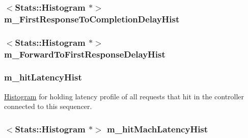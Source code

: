 \label{classProfiler_a32e2ae13dc24a9bd92b83fa9e02477ff}
\hypertarget{classProfiler_a6236c49462f2162310ca62569ec869ac}{
\subsubsection[{m\_\-FirstResponseToCompletionDelayHist}]{$<${\bf Stats::Histogram} $\ast$$>$ {\bf m\_\-FirstResponseToCompletionDelayHist}}}
\label{classProfiler_a6236c49462f2162310ca62569ec869ac}
\hypertarget{classProfiler_ae9bea11c9b001a155e7f7a0f39ac7bf9}{
\subsubsection[{m\_\-ForwardToFirstResponseDelayHist}]{$<${\bf Stats::Histogram} $\ast$$>$ {\bf m\_\-ForwardToFirstResponseDelayHist}}}
\label{classProfiler_ae9bea11c9b001a155e7f7a0f39ac7bf9}
\hypertarget{classProfiler_aa7b4f1cb2f6f69fac85f5fa0be12f95a}{
\subsubsection[{m\_\-hitLatencyHist}]{ {\bf m\_\-hitLatencyHist}}}
\label{classProfiler_aa7b4f1cb2f6f69fac85f5fa0be12f95a}
\hyperlink{classHistogram}{Histogram} for holding latency profile of all requests that hit in the controller connected to this sequencer. \hypertarget{classProfiler_add8e2c73ddfe42f1b177e641a0e626d5}{
\subsubsection[{m\_\-hitMachLatencyHist}]{$<${\bf Stats::Histogram} $\ast$$>$ {\bf m\_\-hitMachLatencyHist}}}
